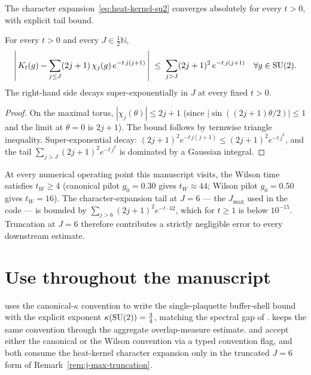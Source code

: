 The character expansion~\eqref{eq:heat-kernel-su2} converges
absolutely for every $t > 0$, with explicit tail bound.

\begin{proposition}
\label{prop:character-tail}
For every $t > 0$ and every $J \in \tfrac12\mathbb{N}$,
\begin{equation}
  \label{eq:character-tail-bound}
  \left|\,K_t(g) - \sum_{j \le J} (2j+1)\, \chi_j(g)\, e^{-t\,j(j+1)}\,\right|
  \;\le\;
  \sum_{j > J} (2j+1)^2 \, e^{-t\,j(j+1)}
  \quad\forall g \in \mathrm{SU}(2) .
\end{equation}
The right-hand side decays super-exponentially in $J$ at every
fixed $t > 0$.
\end{proposition}

\begin{proof}
On the maximal torus, $|\chi_j(\theta)| \le 2j + 1$ (since
$|\sin((2j+1)\theta/2)| \le 1$ and the limit at $\theta = 0$ is
$2j+1$).  The bound follows by termwise triangle inequality.
Super-exponential decay: $(2j+1)^2 e^{-t\,j(j+1)} \le
(2j+1)^2 e^{-t\,j^2}$, and the tail $\sum_{j > J} (2j+1)^2
e^{-t\,j^2}$ is dominated by a Gaussian integral.
\end{proof}

\begin{remark}
\label{rem:j-max-truncation}
At every numerical operating point this manuscript visits, the
Wilson time satisfies $t_W \ge 4$ (canonical pilot $g_0 = 0.30$
gives $t_W \approx 44$; Wilson pilot $g_0 = 0.50$ gives $t_W = 16$).
The character-expansion tail at $J = 6$ — the $J_{\max}$ used in the
code — is bounded by $\sum_{j > 6} (2j+1)^2 e^{-t \cdot 42}$, which
for $t \ge 1$ is below $10^{-15}$.  Truncation at $J = 6$ therefore
contributes a strictly negligible error to every downstream
estimate.
\end{remark}

\section{Use throughout the manuscript}
\label{sec:heat-kernel-downstream}

 uses the canonical-$\kappa$ convention to
write the single-plaquette buffer-shell bound with the explicit
exponent $\kappa(\mathrm{SU}(2)) = \tfrac34$, matching the spectral gap of
.   keeps the same
convention through the aggregate overlap-measure estimate.
 and  accept either
the canonical or the Wilson convention via a typed convention flag,
and both consume the heat-kernel character expansion only in the
truncated $J = 6$ form of Remark~\ref{rem:j-max-truncation}.


